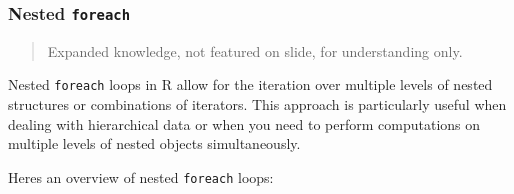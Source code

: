 \documentclass[
]{article}
\begin{document}
\hypertarget{nested-foreach}{%
\subsubsection{\texorpdfstring{Nested
\texttt{foreach}}{Nested foreach}}\label{nested-foreach}}

\begin{quote}
Expanded knowledge, not featured on slide, for understanding only.
\end{quote}

Nested \texttt{foreach} loops in R allow for the iteration over multiple
levels of nested structures or combinations of iterators. This approach
is particularly useful when dealing with hierarchical data or when you
need to perform computations on multiple levels of nested objects
simultaneously.

Here\textquotesingle s an overview of nested \texttt{foreach} loops:
\end{document}
